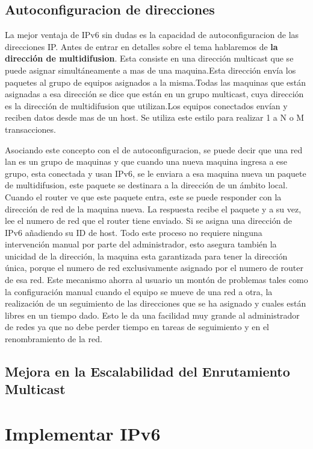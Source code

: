 \documentclass[11pt,a4paper]{article}
\begin{document}
\subsection{Autoconfiguracion de direcciones}
La mejor ventaja de IPv6 sin dudas es la capacidad de autoconfiguracion de las direcciones IP. Antes 
de entrar en detalles sobre el tema hablaremos de \textbf{la dirección de multidifusion}. Esta 
consiste en una dirección multicast que se puede asignar simultáneamente a mas de una maquina.Esta 
dirección envía los paquetes al grupo de equipos asignados a la misma.Todas las maquinas que están 
asignadas a esa dirección se dice que están en un grupo multicast, cuya dirección es la dirección  
de multidifusion que utilizan.Los equipos conectados envían y reciben datos desde mas de un host. Se 
utiliza este estilo para realizar 1 a N o M transacciones.\par
Asociando este concepto con el de autoconfiguracion, se puede decir que una red lan es un grupo de 
maquinas y que cuando una nueva maquina ingresa a ese grupo, esta conectada y usan IPv6, se le 
enviara a esa maquina nueva un paquete de multidifusion, este paquete se destinara a la dirección 
de un ámbito local. Cuando el router ve que este paquete entra, este se puede responder con la 
dirección de red de la maquina nueva. La respuesta recibe el paquete y a su vez, lee el numero de 
red que el router tiene enviado. Si se asigna una dirección de IPv6 añadiendo su ID de host. Todo 
este proceso no requiere ninguna intervención manual por parte del administrador, esto asegura 
también la unicidad de la dirección, la maquina esta garantizada para tener la dirección única, 
porque el numero de red exclusivamente asignado por el numero de router de esa red.
Este mecanismo ahorra al usuario un montón de problemas tales como la configuración manual cuando el 
equipo se mueve de una red a otra, la realización de un seguimiento de las direcciones que se ha 
asignado y cuales están libres en un tiempo dado.
Esto le da una facilidad muy grande al administrador de redes ya que no debe perder tiempo en tareas 
de seguimiento y en el renombramiento de la red.
\subsection{Mejora en la Escalabilidad del Enrutamiento Multicast}


\section{Implementar IPv6}
\end{document}
